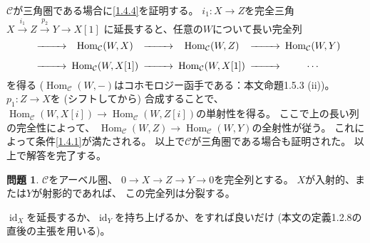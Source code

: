 \documentclass[uplatex,dvipdfmx]{jsarticle}
\makeatletter
\theoremstyle{definition}
\newtheorem{prob}[prob]{問題}
\renewenvironment{proof}[1][\proofname]{
  \pushQED{\qed}%
  \normalfont \topsep6\p@\@plus6\p@\relax
  \trivlist
  \item[\hskip\labelsep
    #1\@addpunct{\textbf{.}}]\ignorespaces
}{%
  \popQED\endtrivlist\@endpefalse
}
\providecommand{\proofname}{証明}
\DeclareMathOperator{\Hom}{\mathrm{Hom}}
\DeclareMathOperator{\id}{\mathrm{id}}
\newcommand\mcC{\mathcal{C}}
\makeatother
\begin{document}
\begin{proof}
  \(\mcC\)が三角圏である場合に\ref{1.4.4}を証明する。
  \(i_1:X\to Z\)を完全三角
  \(X\xrightarrow{i_1} Z\xrightarrow{p_2} Y\to X[1]\)
  に延長すると、任意の\(W\)について長い完全列
  \[
  \begin{CD}
    @>>> \Hom_{\mcC}(W,X) @>>> \Hom_{\mcC}(W,Z) @>>> \Hom_{\mcC}(W,Y) \\
    @>>> \Hom_{\mcC}(W,X[1]) @>>> \Hom_{\mcC}(W,X[1]) @>>> \cdots
  \end{CD}
  \]
  を得る (\(\Hom_{\mcC}(W,-)\)はコホモロジー函手である：本文命題1.5.3 (ii))。
  \(p_1:Z\to X\)を (シフトしてから) 合成することで、
  \(\Hom_{\mcC}(W,X[i]) \to \Hom_{\mcC}(W,Z[i])\)の単射性を得る。
  ここで上の長い列の完全性によって、
  \(\Hom_{\mcC}(W,Z) \to \Hom_{\mcC}(W,Y)\)の全射性が従う。
  これによって条件\ref{1.4.1}が満たされる。
  以上で\(\mcC\)が三角圏である場合も証明された。
  以上で解答を完了する。
\end{proof}




\begin{prob}\label{1.5}
  \(\mcC\)をアーベル圏、
  \(0\to X\to Z\to Y\to 0\)を完全列とする。
  \(X\)が入射的、または\(Y\)が射影的であれば、
  この完全列は分裂する。
\end{prob}

\begin{proof}
  \(\id_X\)を延長するか、\(\id_Y\)を持ち上げるか、をすれば良いだけ
  (本文の定義1.2.8の直後の主張を用いる)。
\end{proof}
\end{document}
